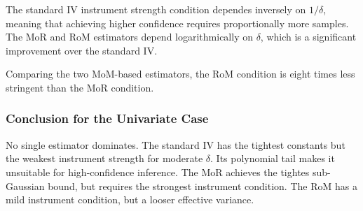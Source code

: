 The standard IV instrument strength condition dependes inversely on $1/\delta$, meaning that achieving higher confidence requires proportionally more samples.
The MoR and RoM estimators depend logarithmically on $\delta$, which is a significant improvement over the standard IV.

Comparing the two MoM-based estimators, the RoM condition is eight times less stringent than the MoR condition.

\subsubsection{Conclusion for the Univariate Case}

No single estimator dominates. The standard IV has the tightest constants but the weakest instrument strength for moderate $\delta$. Its polynomial tail makes it unsuitable for high-confidence inference. The MoR achieves the tightes sub-Gaussian bound, but requires the strongest instrument condition. The RoM has a mild instrument condition, but a looser effective variance.